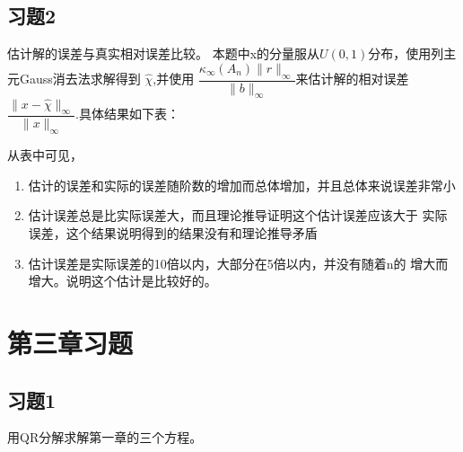 \documentclass{ctexart}
\begin{document}
\subsection*{习题2}
估计解的误差与真实相对误差比较。
本题中x的分量服从$U(0,1)$分布，使用列主元Gauss消去法求解得到
$\widehat{\chi}$,并使用
$\dfrac{\kappa_{\infty}(A_n)\|r\|_{\infty}}{\|b\|_\infty}$来估计解的相对误差$\dfrac{\|x-\widehat{\chi}\|_\infty}{\|x\|_\infty}$.具体结果如下表：

从表中可见，
\begin{enumerate}
\item
估计的误差和实际的误差随阶数的增加而总体增加，并且总体来说误差非常小
\item
估计误差总是比实际误差大，而且理论推导证明这个估计误差应该大于
实际误差，这个结果说明得到的结果没有和理论推导矛盾
\item
估计误差是实际误差的10倍以内，大部分在5倍以内，并没有随着n的
增大而增大。说明这个估计是比较好的。
\end{enumerate}

\section*{第三章习题}
\subsection*{习题1}
用QR分解求解第一章的三个方程。
\end{document}
